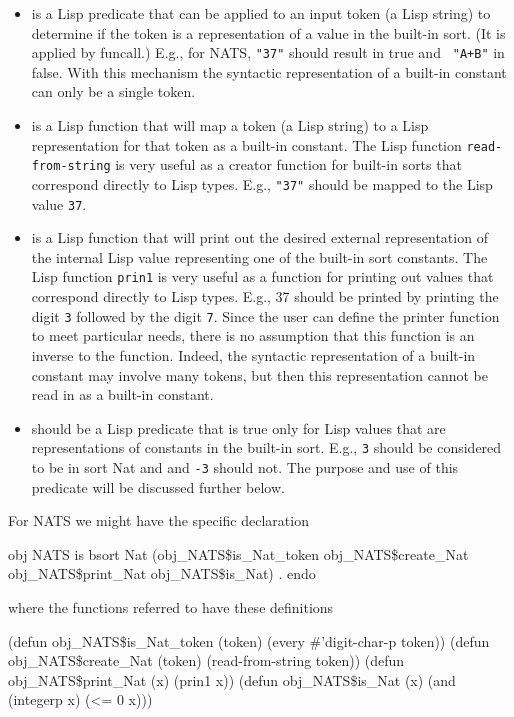 \begin{itemize}
\item
{} is a Lisp predicate that can be applied to an
input token (a Lisp string) to determine if the token is a
representation of a value in the built-in sort.  (It is applied by
funcall.)  E.g., for NATS, {\tt "37"} should result in true and {\tt
"A+B"} in false.  With this mechanism the syntactic representation of
a built-in constant can only be a single token.

\item {} is a Lisp function that will map a token (a Lisp
string) to a Lisp representation for that token as a built-in
constant.  The Lisp function {\tt read-from-string} is very useful as
a creator function for built-in sorts that correspond directly to Lisp
types.  E.g., {\tt "37"} should be mapped to the Lisp value {\tt 37}.

\item {} is a Lisp function that will print out the desired
external representation of the internal Lisp value representing one of
the built-in sort constants.  The Lisp function {\tt prin1} is very
useful as a  function for printing out values that
correspond directly to Lisp types.  E.g., 37 should be printed by
printing the digit {\tt 3} followed by the digit {\tt 7}.  Since the
user can define the printer function to meet particular needs, there
is no assumption that this function is an inverse to the 
function.  Indeed, the syntactic representation of a built-in constant
may involve many tokens, but then this representation cannot be read
in as a built-in constant.

\item {} should be a Lisp predicate that is true only
for Lisp values that are representations of constants in the built-in
sort.  E.g., {\tt 3} should be considered to be in sort Nat and and
{\tt -3} should not.  The purpose and use of this predicate will be
discussed further below.
\end{itemize}

For NATS we might have the specific declaration

\bobj
obj NATS is
  bsort Nat (obj_NATS\$is_Nat_token obj_NATS\$create_Nat
               obj_NATS\$print_Nat obj_NATS\$is_Nat) .
endo
\eobj

\noindent
where the functions referred to have these definitions

\bobj
(defun obj_NATS\$is_Nat_token (token)
  (every #'digit-char-p token))
(defun obj_NATS\$create_Nat (token) (read-from-string token))
(defun obj_NATS\$print_Nat (x) (prin1 x))
(defun obj_NATS\$is_Nat (x) (and (integerp x) (<= 0 x)))
\eobj

